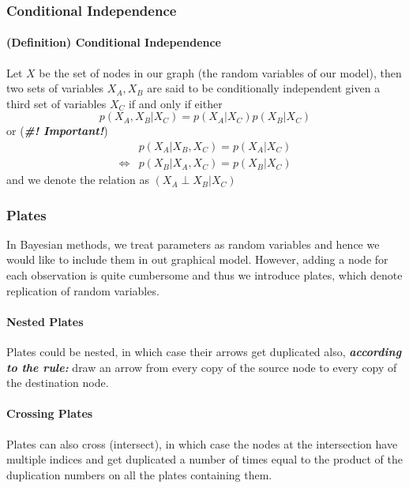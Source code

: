 \documentclass[11pt]{article}
\newcommand{\independent}{\perp}
\begin{document}
\subsubsection{Conditional Independence} 
\paragraph{(Definition) Conditional Independence} Let $X$ be the set of nodes in our graph (the random variables of our model), then two sets of variables $X_A, X_B$ are said to be conditionally independent given a third set of variables $X_C$ if and only if either
\begin{equation*}
    p\left(X_{A}, X_{B} | X_{C}\right)=p\left(X_{A} | X_{C}\right) p\left(X_{B} | X_{C}\right)
\end{equation*}
or (\textit{\textbf{\#! Important!}})
\begin{align*}
    &p\left(X_{A} | X_{B}, X_{C}\right)=p\left(X_{A} | X_{C}\right) \\
    \iff &p\left(X_{B} | X_{A}, X_{C}\right)=p\left(X_{B} | X_{C}\right)
\end{align*}
and we denote the relation as $\left(X_{A} \independent X_{B} | X_{C}\right)$

\subsubsection{Plates}
In Bayesian methods, we treat parameters as random variables and hence we would like to include them in out graphical model. However, adding a node for each observation is quite cumbersome and thus we introduce plates, which denote replication of random variables. 

\paragraph{Nested Plates}
Plates could be nested, in which case their arrows get duplicated also, \textit{\textbf{according to the rule:}} draw an arrow from every copy of the source node to every copy of the destination node.

\paragraph{Crossing Plates}
Plates can also cross (intersect), in which case the nodes at the intersection have multiple indices and get duplicated a number of times equal to the product of the duplication numbers on all the plates containing them.
\end{document}
